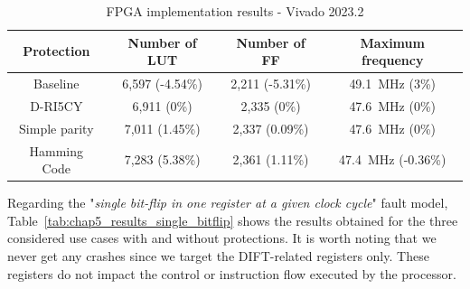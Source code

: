 \begin{table}[t]
    \footnotesize
    \centering
    \caption{FPGA implementation results - Vivado 2023.2}
    \label{tab:chap5_implementation}
    \setlength{\tabcolsep}{3pt}
    \begin{tabular}{@{}c|ccc@{}}
        \toprule
        Protection    & Number of LUT   & Number of FF    & Maximum frequency                \\ \midrule
        Baseline      & 6,597 (-4.54\%) & 2,211 (-5.31\%) & \SI{49.1}{\mega\hertz} (3\%)     \\
        D-RI5CY       & 6,911 (0\%)     & 2,335 (0\%)     & \SI{47.6}{\mega\hertz} (0\%)     \\
        Simple parity & 7,011 (1.45\%)  & 2,337 (0.09\%)  & \SI{47.6}{\mega\hertz} (0\%)     \\
        Hamming Code  & 7,283 (5.38\%)  & 2,361 (1.11\%)  & \SI{47.4}{\mega\hertz} (-0.36\%) \\
        \bottomrule
    \end{tabular}
\end{table}

Regarding the "\textit{single bit-flip in one register at a given clock cycle}" fault model, Table~\ref{tab:chap5_results_single_bitflip} shows the results obtained for the three considered use cases with and without protections. It is worth noting that we never get any crashes since we target the DIFT-related registers only. These registers do not impact the control or instruction flow executed by the processor.

